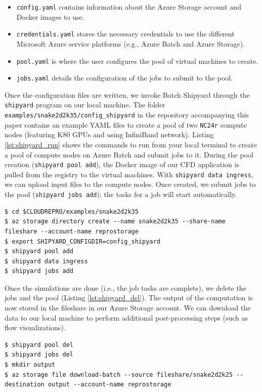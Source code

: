 \documentclass[10pt,journal,compsoc]{IEEEtran}
\begin{document}
\begin{itemize}
    \item \texttt{config.yaml} contains information about the Azure Storage account and Docker images to use.
    \item \texttt{credentials.yaml} stores the necessary credentials to use the different Microsoft Azure service platforms (e.g., Azure Batch and Azure Storage).
    \item \texttt{pool.yaml} is where the user configures the pool of virtual machines to create.
    \item \texttt{jobs.yaml} details the configuration of the jobs to submit to the pool.
\end{itemize}

Once the configuration files are written, we invoke Batch Shipyard through the \texttt{shipyard} program on our local machine.
The folder \texttt{examples/snake2d2k35/config\_shipyard} in the repository accompanying this paper contains an example YAML files to create a pool of two \texttt{NC24r} compute nodes (featuring K80 GPUs and using InfiniBand network).
Listing \ref{lst:shipyard_run} shows the commands to run from your local terminal to create a pool of compute nodes on Azure Batch and submit jobs to it.
During the pool creation (\texttt{shipyard pool add}), the Docker image of our CFD application is pulled from the registry to the virtual machines.
With \texttt{shipyard data ingress}, we can upload input files to the compute nodes.
Once created, we submit jobs to the pool (\texttt{shipyard jobs add}); the tasks for a job will start automatically.

\begin{lstlisting}[label=lst:shipyard_run,caption={Create a pool with Batch Shipyard and submit jobs to it.}]
$ cd $CLOUDREPRO/examples/snake2d2k35
$ az storage directory create --name snake2d2k35 --share-name fileshare --account-name reprostorage
$ export SHIPYARD_CONFIGDIR=config_shipyard
$ shipyard pool add
$ shipyard data ingress
$ shipyard jobs add
\end{lstlisting}

Once the simulations are done (i.e., the job tasks are complete), we delete the jobs and the pool (Listing \ref{lst:shipyard_del}).
The output of the computation is now stored in the fileshare in our Azure Storage account.
We can download the data to our local machine to perform additional post-processing steps (such as flow visualizations).

\begin{lstlisting}[label=lst:shipyard_del,caption={Delete the pool and jobs, and download to output to a local machine.}]
$ shipyard pool del
$ shipyard jobs del
$ mkdir output
$ az storage file download-batch --source fileshare/snake2d2k25 --destination output --account-name reprostorage
\end{lstlisting}
\end{document}
